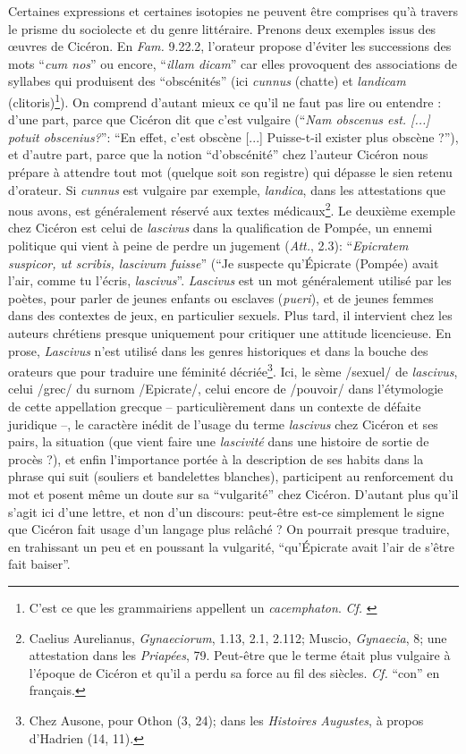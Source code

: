 Certaines expressions et certaines isotopies ne peuvent être comprises qu'à travers le prisme du sociolecte et du genre littéraire. Prenons deux exemples issus des œuvres de Cicéron. En \textit{Fam.} 9.22.2, l'orateur propose d'éviter les successions des mots \enquote{\textit{cum nos}} ou encore, \enquote{\textit{illam dicam}} car elles provoquent des associations de syllabes qui produisent des \enquote{obscénités} (ici \textit{cunnus} (chatte) et \textit{landicam} (clitoris)\footnote{C'est ce que les grammairiens appellent un \textit{cacemphaton}. \textit{Cf.} \textcite{nicolas2007gros}}). On comprend d'autant mieux ce qu'il ne faut pas lire ou entendre : d'une part, parce que Cicéron dit que c'est vulgaire (\enquote{\textit{Nam obscenus est. [...] potuit obscenius?}}: \enquote{En effet, c'est obscène [...] Puisse-t-il exister plus obscène ?}), et d'autre part, parce que la notion \enquote{d'obscénité} chez l'auteur Cicéron nous prépare à attendre tout mot (quelque soit son registre) qui dépasse le sien retenu d'orateur. Si \textit{cunnus} est vulgaire par exemple, \textit{landica}, dans les attestations que nous avons, est généralement réservé aux textes médicaux\footnote{Caelius Aurelianus, \textit{Gynaeciorum}, 1.13, 2.1, 2.112; Muscio, \textit{Gynaecia}, 8; une attestation dans les \textit{Priapées}, 79. Peut-être que le terme était plus vulgaire à l'époque de Cicéron et qu'il a perdu sa force au fil des siècles. \textit{Cf.} \enquote{con} en français.}. Le deuxième exemple chez Cicéron est celui de \textit{lascivus} dans la qualification de Pompée, un ennemi politique qui vient à peine de perdre un jugement (\textit{Att.}, 2.3): \enquote{\textit{Epicratem suspicor, ut scribis, lascivum fuisse}} (\enquote{Je suspecte qu'Épicrate (Pompée) avait l'air, comme tu l'écris, \textit{lascivus}}. \textit{Lascivus} est un mot généralement utilisé par les poètes, pour parler de jeunes enfants ou esclaves (\textit{pueri}), et de jeunes femmes dans des contextes de jeux, en particulier sexuels. Plus tard, il intervient chez les auteurs chrétiens presque uniquement pour critiquer une attitude licencieuse. En prose, \textit{Lascivus} n'est utilisé dans les genres historiques et dans la bouche des orateurs que pour traduire une féminité décriée\footnote{Chez Ausone, pour Othon (3, 24); dans les \textit{Histoires Augustes}, à propos d'Hadrien (14, 11).}. Ici, le sème /sexuel/ de \textit{lascivus}, celui /grec/ du surnom /Epicrate/, celui encore de /pouvoir/ dans l'étymologie de cette appellation grecque -- particulièrement dans un contexte de défaite juridique --, le caractère inédit de l'usage du terme \textit{lascivus} chez Cicéron et ses pairs, la situation (que vient faire une \textit{lascivité} dans une histoire de sortie de procès ?), et enfin l'importance portée à la description de ses habits dans la phrase qui suit (souliers et bandelettes blanches), participent au renforcement du mot et posent même un doute sur sa \enquote{vulgarité} chez Cicéron. D'autant plus qu'il s'agit ici d'une lettre, et non d'un discours: peut-être est-ce simplement le signe que Cicéron fait usage d'un langage plus relâché ? On pourrait presque traduire, en trahissant un peu et en poussant la vulgarité, \enquote{qu'Épicrate avait l'air de s'être fait baiser}.


